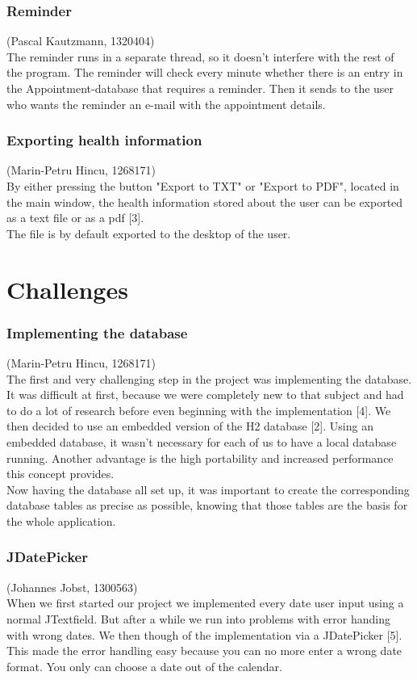 \documentclass[a4paper, 12pt]{report}
\begin{document}
\subsection{Reminder}
{\tiny (Pascal Kautzmann, 1320404)\\}
The reminder runs in a separate thread, so it doesn't interfere with the rest of the program.
The reminder will check every minute whether there is an entry in the Appointment-database that requires a reminder. 
Then it sends to the user who wants the reminder an e-mail with the appointment details.

\subsection{Exporting health information}
{\tiny (Marin-Petru Hincu, 1268171)\\}
By either pressing the button "Export to TXT" or "Export to PDF", located in the main window, the health information stored about the user can be exported as a text file or as a pdf [3].\\ The file is by default exported to the desktop of the user.

\chapter{Challenges}
\subsection{Implementing the database}
{\tiny (Marin-Petru Hincu, 1268171)\\}
The first and very challenging step in the project was implementing the database. It was difficult at first, because we were completely new to that subject and had to do a lot of research before even beginning with the implementation [4]. We then decided to use an embedded version of the H2 database [2].
Using an embedded database, it wasn't necessary for each of us to have a local database running. Another advantage is the high portability and increased performance this concept provides.\\
Now having the database all set up, it was important to create the corresponding database tables as precise as possible, knowing that those tables are the basis for the whole application. \\

\subsection{JDatePicker}
{\tiny (Johannes Jobst, 1300563)\\}
When we first started our project we implemented every date user input using a normal JTextfield. But after a while we run into problems with error handing with wrong dates. We then though of the implementation via a JDatePicker [5]. This made the error handling easy because you can no more enter a wrong date format. You only can choose a date out of the calendar.
\end{document}
